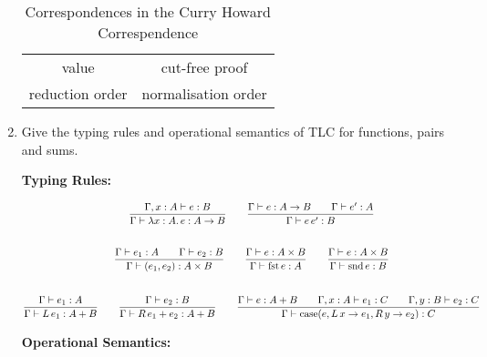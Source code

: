 \documentclass[10pt,\jkfside,a4paper]{article}
\begin{document}
\begin{enumerate}
\begin{table}[H]
\begin{tabular}{c|c}
            value & cut-free proof \\

            reduction order & normalisation order \\

        \end{tabular}

        \caption{Correspondences in the Curry Howard Correspendence}

        \label{tab:curryhoward}

    \end{table}

    \item Give the typing rules and operational semantics of TLC for functions, pairs and sums.

    \textbf{Typing Rules:}

    \begin{gather*}
        \dfrac{
            \Gamma, x: A \vdash e: B
        }{
            \Gamma \vdash \lambda x: A \ldotp e: A \to B
        }
        \qquad
        \dfrac{
            \Gamma \vdash e: A \to B \qquad \Gamma \vdash e': A
        }{
            \Gamma \vdash e\, e': B
        }
        \\[2em]
        \dfrac{
            \Gamma \vdash e_1: A \qquad \Gamma \vdash e_2: B
        }{
            \Gamma \vdash (e_1, e_2): A \times B
        }
        \qquad
        \dfrac{
            \Gamma \vdash e: A \times B
        }{
            \Gamma \vdash \mathrm{fst}\, e: A
        }
        \qquad
        \dfrac{
            \Gamma \vdash e: A \times B
        }{
            \Gamma \vdash \mathrm{snd}\, e: B
        }
        \\[2em]
        \dfrac{
            \Gamma \vdash e_1: A
        }{
            \Gamma \vdash L\, e_1: A + B
        }
        \qquad
        \dfrac{
            \Gamma \vdash e_2: B
        }{
            \Gamma \vdash R\, e_1 + e_2: A + B
        }
        \qquad
        \dfrac{
            \Gamma \vdash e: A + B
            \qquad
            \Gamma, x: A \vdash e_1: C
            \qquad
            \Gamma, y: B \vdash e_2: C
        }{
            \Gamma \vdash \mathrm{case}(e, L\, x \to e_1, R\, y \to e_2) : C
        }
    \end{gather*}

    \textbf{Operational Semantics:}


\end{enumerate}
\end{document}
